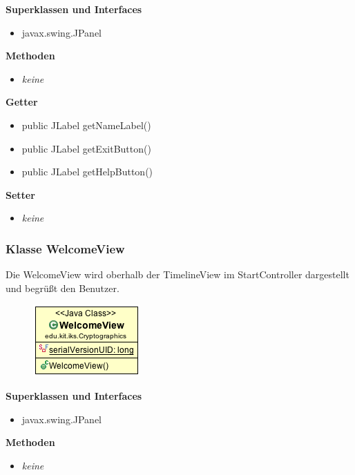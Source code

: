 \documentclass{article}
\begin{document}
      \textbf{Superklassen und Interfaces}
      \begin{itemize}
        \item javax.swing.JPanel
      \end{itemize}
      
      \textbf{Methoden}
      \begin{itemize}
        \item \textit{keine}
      \end{itemize}

      \textbf{Getter}
      \begin{itemize}
        \item public JLabel getNameLabel()
        \item public JLabel getExitButton()
        \item public JLabel getHelpButton()
      \end{itemize}

      \textbf{Setter}
      \begin{itemize}
        \item \textit{keine}
      \end{itemize}

    \subsubsection{Klasse WelcomeView}
      Die WelcomeView wird oberhalb der TimelineView im StartController dargestellt und begrüßt den Benutzer.
      \begin{figure}[H]
        \centering
        \includegraphics{resources/edu-kit-iks-Cryptographics-WelcomeView}
      \end{figure}

      \textbf{Superklassen und Interfaces}
      \begin{itemize}
        \item javax.swing.JPanel
      \end{itemize}
      
      \textbf{Methoden}
      \begin{itemize}
        \item \textit{keine}
      \end{itemize}
\end{document}
